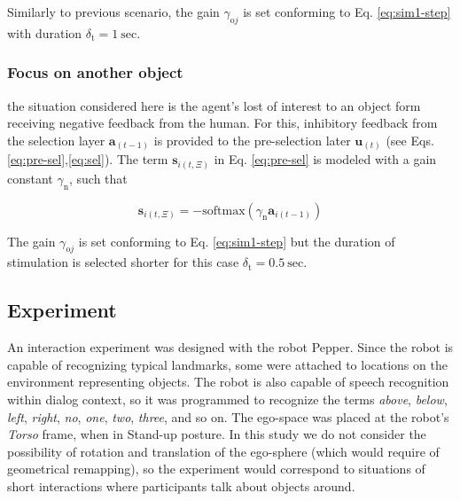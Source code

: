 \documentclass[letterpaper, 10 pt, conference]{ieeeconf}  %
\begin{document}
	\noindent Similarly to previous scenario, the gain $\gamma_{\mathrm{o}j}$ is set conforming to Eq. \eqref{eq:sim1-step} with duration $\delta_\mathrm{t} = 1\ \mathrm{sec}$. 
	
	\subsubsection{Focus on another object} the situation considered here is the agent's lost of interest to an object form receiving negative feedback from the human. For this, inhibitory feedback from the selection layer $\mathbf{a}_{(t-1)}$ is provided to the pre-selection later $\mathbf{u}_{(t)}$ (see Eqs. \eqref{eq:pre-sel},\eqref{eq:sel}). The term $\mathbf{s}_{i(t,\Xi)}$ in Eq. \eqref{eq:pre-sel} is modeled with a gain constant $\gamma_\mathrm{n}$, such that
	
	\begin{equation}
	\mathbf{s}_{i(t,\Xi)} = -\mathrm{softmax}\left(\gamma_\mathrm{n}\mathbf{a}_{i(t-1)}\right)
	\label{eq:sim3}
	\end{equation}
	
	\noindent The gain $\gamma_{\mathrm{o}j}$ is set conforming to Eq. \eqref{eq:sim1-step} but the duration of stimulation is selected shorter for this case $\delta_\mathrm{t} = 0.5\ \mathrm{sec}$. 
		
	
	\subsection{Experiment}
	
	An interaction experiment was designed with the robot Pepper. Since the robot is capable of recognizing typical landmarks, some were attached to locations on the environment representing objects. The robot is also capable of speech recognition within dialog context, so it was programmed to recognize the terms \textit{above}, \textit{below}, \textit{left}, \textit{right}, \textit{no}, \textit{one}, \textit{two}, \textit{three}, and so on. The ego-space was placed at the robot's \textit{Torso} frame, when in Stand-up posture. In this study we do not consider the possibility of rotation and translation of the ego-sphere (which would require of geometrical remapping), so the experiment would correspond to situations of short interactions where participants talk about objects around. 
	
\end{document}
